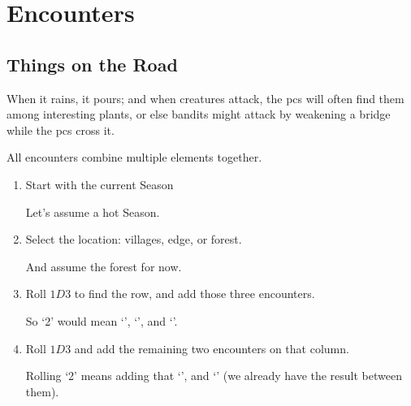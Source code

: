 \chapter[Encounters at the Crossroads]{Encounters}
\label{encounters}

\section{Things on the Road}

When it rains, it pours; and when creatures attack, the \glspl{pc} will often find them among interesting plants, or else bandits might attack by weakening a bridge while the \glspl{pc} cross it.


\begin{multicols}{2}

All encounters combine multiple elements together.

\begin{enumerate}
  \item
  Start with the current Season

  \begin{exampletext}
    Let's assume a hot Season.
  \end{exampletext}
  \item
  Select the location: villages, edge, or forest.

  \begin{exampletext}
    And assume the forest for now.
  \end{exampletext}
  \item
  Roll $1D3$ to find the row, and add those three encounters.

  \begin{exampletext}
    So `2' would mean
    \setcounter{enc}{1}%
    \setcounter{track}{2}%
    `\encBigList',
    `\encBigList', and
    `\encBigList'.
  \end{exampletext}

  \item
  Roll $1D3$ and add the remaining two encounters on that column.

  \begin{exampletext}
    Rolling `2' means adding
    \setcounter{enc}{0}%
    \setcounter{track}{3}%
    that `\encBigList', and
    `\encBigList'
    (we already have the result between them).
  \end{exampletext}


\end{enumerate}
\end{multicols}
